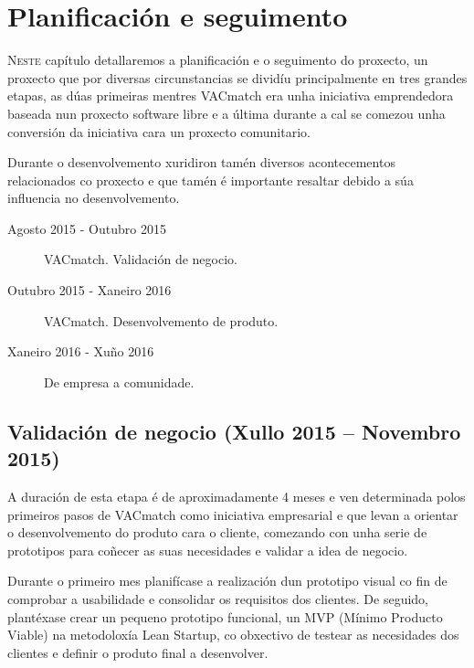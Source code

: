 \chapter{Planificación e seguimento}
\minitoc


  \lettrine{N}{este} capítulo detallaremos a planificación e o seguimento 
do proxecto, un proxecto que por diversas circunstancias se dividíu 
principalmente en tres grandes etapas, as dúas primeiras mentres VACmatch era 
unha iniciativa emprendedora baseada nun proxecto software libre e a última 
durante a cal se comezou unha conversión da iniciativa cara un proxecto 
comunitario.

  Durante o desenvolvemento xuridiron tamén diversos acontecementos 
relacionados co proxecto e que tamén é importante resaltar debido a súa 
influencia no desenvolvemento.

  \begin{description}
    \item [Agosto 2015 - Outubro 2015] VACmatch. Validación de negocio.
    \item [Outubro 2015 - Xaneiro 2016] VACmatch. Desenvolvemento de produto.
    \item [Xaneiro 2016 - Xuño 2016] De empresa a comunidade.
  \end{description}


  \section{Validación de negocio (Xullo 2015 -- Novembro 2015)}
  A duración de esta etapa é de aproximadamente 4 meses e ven determinada polos 
primeiros pasos de VACmatch como iniciativa empresarial e que levan a orientar 
o desenvolvemento do produto cara o cliente, comezando con unha serie de 
prototipos para coñecer as suas necesidades e validar a idea de 
negocio.

  Durante o primeiro mes planifícase a realización dun prototipo visual co 
fin de comprobar a usabilidade e consolidar os requisitos dos clientes.
  De seguido, plantéxase crear un pequeno prototipo funcional, un MVP (Mínimo 
Producto Viable) na metodoloxía Lean Startup, co obxectivo de testear as 
necesidades dos clientes e definir o produto final a desenvolver.

